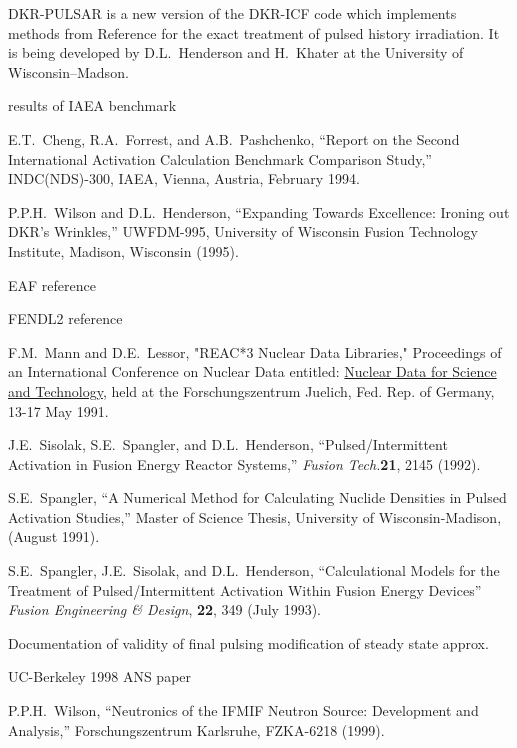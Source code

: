 \begin{thebibliography}{100}
 DKR-PULSAR is a new version of the DKR-ICF code
  which implements methods from Reference  for the
  exact treatment of pulsed history irradiation.  It is being
  developed by D.L.~Henderson and H.~Khater at the University of
  Wisconsin--Madson.

 results of IAEA benchmark
  
E.T.~Cheng, R.A.~Forrest, and
  A.B.~Pashchenko, ``Report on the Second International Activation
  Calculation Benchmark Comparison Study,'' INDC(NDS)-300, IAEA,
  Vienna, Austria, February 1994.

 P.P.H.~Wilson and D.L.~Henderson, ``Expanding Towards
  Excellence: Ironing out DKR's Wrinkles,'' UWFDM-995, University of
  Wisconsin Fusion Technology Institute, Madison, Wisconsin (1995).
  
 EAF reference

 FENDL2 reference

F.M.~Mann and D.E.~Lessor, "REAC*3 Nuclear Data
  Libraries," Proceedings of an International Conference on Nuclear
  Data entitled: \underline{Nuclear Data for Science and Technology},
  held at the Forschungszentrum Juelich, Fed. Rep. of Germany, 13-17
  May 1991.

 J.E.~Sisolak, S.E.~Spangler, and D.L.~Henderson,
  ``Pulsed/Intermittent Activation in Fusion Energy Reactor Systems,''
  \textsl{Fusion Tech.}\textbf{21}, 2145 (1992).
  
 S.E.~Spangler, ``A Numerical Method for
  Calculating Nuclide Densities in Pulsed Activation Studies,'' Master
  of Science Thesis, University of Wisconsin-Madison, (August 1991).
  
 S.E.~Spangler, J.E.~Sisolak, and D.L.~Henderson,
  ``Calculational Models for the Treatment of Pulsed/Intermittent
  Activation Within Fusion Energy Devices'' \textsl{Fusion Engineering
    \& Design}, \textbf{22}, 349 (July 1993).
  
 Documentation of validity of final pulsing
  modification of steady state approx.
  
 UC-Berkeley 1998 ANS paper

 P.P.H.~Wilson, ``Neutronics of the IFMIF Neutron
  Source: Development and Analysis,'' Forschungszentrum Karlsruhe,
  FZKA-6218 (1999).
  

\end{thebibliography}
